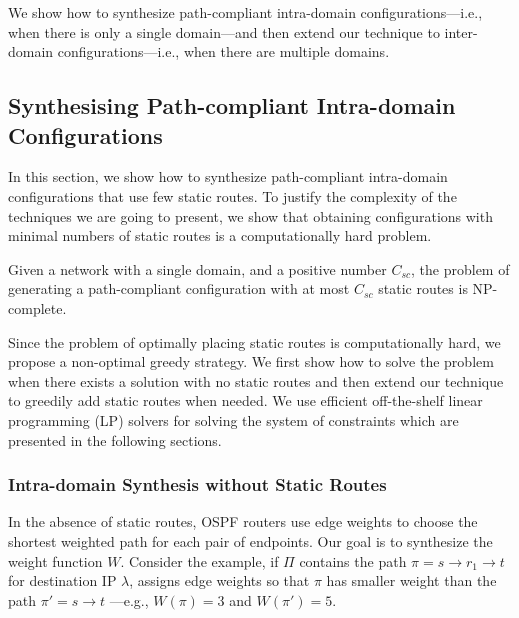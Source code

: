 We show how to synthesize 
path-compliant intra-domain 
configurations---i.e., when there
is only a single domain---and then extend our technique to
 inter-domain configurations---i.e., when
there are multiple domains.

\subsection{Synthesising Path-compliant Intra-domain Configurations} \label{sec:intra-synthesis}
In this section, we show how to synthesize  path-compliant  intra-domain configurations that
use few static routes.
To justify the complexity of the techniques 
we are going to present,
we show that
obtaining configurations with minimal numbers of static routes is a 
computationally hard problem.
\begin{theorem}
\label{thm:ospfsynth}
Given a
network with a single domain,
and a positive number $C_{sc}$,
the problem of generating
a path-compliant configuration with at most $C_{sc}$ static routes
is NP-complete.
\end{theorem}
\iffull

\fi
Since the problem of optimally placing 
static routes is computationally hard, 
we propose a non-optimal greedy strategy.
We first show how to solve the problem when 
there exists a solution with no static routes
and then extend our technique to greedily 
add static routes when needed. We use 
efficient off-the-shelf linear programming (LP) 
solvers for solving the system of constraints 
which are presented in the following sections. 
			
\subsubsection{Intra-domain Synthesis without Static Routes} \label{sec:ospf}
 
In the absence of static routes,
 OSPF routers use edge weights
 to choose the
 shortest weighted path for each pair of endpoints. 
Our goal is to synthesize the weight function $W$.
Consider the  example, 
if $\Pi$ contains the 
 path $\pi=s\rightarrow r_1 \rightarrow t$ for
 destination IP $\lambda$, \name assigns
 edge weights so that $\pi$ has
 smaller weight than the path $\pi'=s \rightarrow t$ ---e.g., $W(\pi)=3$
  and $W(\pi')=5$. 
 
